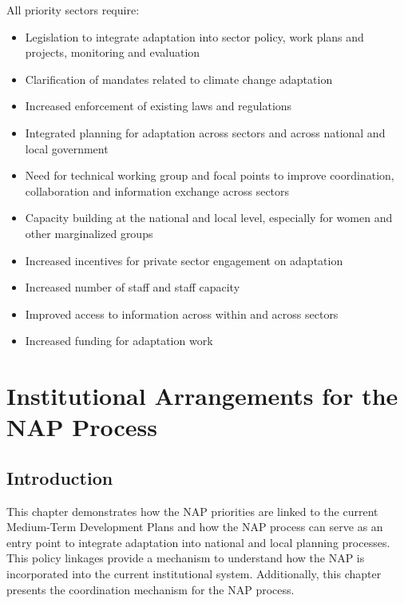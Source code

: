 \documentclass[
]{book}
\providecommand{\tightlist}{%
  \setlength{\itemsep}{0pt}\setlength{\parskip}{0pt}}
\begin{document}
All priority sectors require:

\begin{itemize}
\tightlist
\item
  Legislation to integrate adaptation into sector policy, work plans and projects, monitoring and evaluation
\item
  Clarification of mandates related to climate change adaptation
\item
  Increased enforcement of existing laws and regulations
\item
  Integrated planning for adaptation across sectors and across national and local government
\item
  Need for technical working group and focal points to improve coordination, collaboration and information exchange across sectors
\item
  Capacity building at the national and local level, especially for women and other marginalized groups
\item
  Increased incentives for private sector engagement on adaptation
\item
  Increased number of staff and staff capacity
\item
  Improved access to information across within and across sectors\\
\item
  Increased funding for adaptation work
\end{itemize}

\hypertarget{institutional-arrangements-for-the-nap-process}{%
\chapter{Institutional Arrangements for the NAP Process}\label{institutional-arrangements-for-the-nap-process}}

\hypertarget{introduction-5}{%
\section{Introduction}\label{introduction-5}}

This chapter demonstrates how the NAP priorities are linked to the current Medium-Term Development Plans and how the NAP process can serve as an entry point to integrate adaptation into national and local planning processes. This policy linkages provide a mechanism to understand how the NAP is incorporated into the current institutional system. Additionally, this chapter presents the coordination mechanism for the NAP process.
\end{document}
